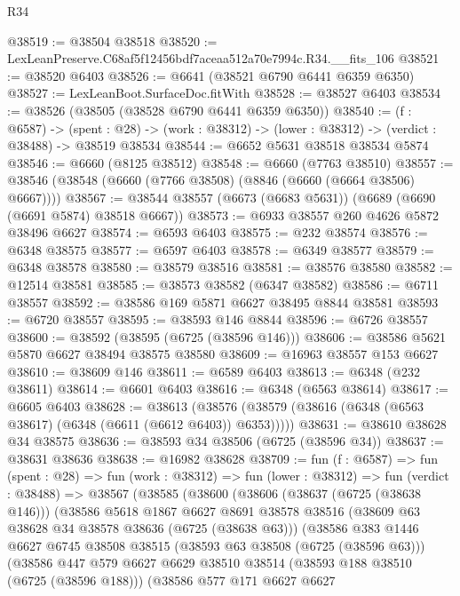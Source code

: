 \begin{lexlean}{R34}
\begin{coremodule}
@38519 := @38504 @38518
@38520 := LexLeanPreserve.C68af5f12456bdf7aceaa512a70e7994c.R34.__fits_106
@38521 := @38520 @6403
@38526 := @6641 (@38521 @6790 @6441 @6359 @6350)
@38527 := LexLeanBoot.SurfaceDoc.fitWith
@38528 := @38527 @6403
@38534 := @38526 (@38505 (@38528 @6790 @6441 @6359 @6350))
@38540 := (f : @6587) ->
  (spent : @28) -> (work : @38312) -> (lower : @38312) -> (verdict : @38488) -> @38519 @38534
@38544 := @6652 @5631 @38518 @38534 @5874
@38546 := @6660 (@8125 @38512)
@38548 := @6660 (@7763 @38510)
@38557 := @38546 (@38548 (@6660 (@7766 @38508) (@8846 (@6660 (@6664 @38506) @6667))))
@38567 := @38544 @38557 (@6673 (@6683 @5631)) (@6689 (@6690 (@6691 @5874) @38518 @6667))
@38573 := @6933 @38557 @260 @4626 @5872 @38496 @6627
@38574 := @6593 @6403
@38575 := @232 @38574
@38576 := @6348 @38575
@38577 := @6597 @6403
@38578 := @6349 @38577
@38579 := @6348 @38578
@38580 := @38579 @38516
@38581 := @38576 @38580
@38582 := @12514 @38581
@38585 := @38573 @38582 (@6347 @38582)
@38586 := @6711 @38557
@38592 := @38586 @169 @5871 @6627 @38495 @8844 @38581
@38593 := @6720 @38557
@38595 := @38593 @146 @8844
@38596 := @6726 @38557
@38600 := @38592 (@38595 (@6725 (@38596 @146)))
@38606 := @38586 @5621 @5870 @6627 @38494 @38575 @38580
@38609 := @16963 @38557 @153 @6627
@38610 := @38609 @146
@38611 := @6589 @6403
@38613 := @6348 (@232 @38611)
@38614 := @6601 @6403
@38616 := @6348 (@6563 @38614)
@38617 := @6605 @6403
@38628 := @38613
    (@38576 (@38579 (@38616 (@6348 (@6563 @38617) (@6348 (@6611 (@6612 @6403)) @6353)))))
@38631 := @38610 @38628 @34 @38575
@38636 := @38593 @34 @38506 (@6725 (@38596 @34))
@38637 := @38631 @38636
@38638 := @16982 @38628
@38709 := fun (f : @6587) =>
  fun (spent : @28) =>
  fun (work : @38312) =>
  fun (lower : @38312) =>
  fun (verdict : @38488) =>
  @38567
    (@38585
      (@38600
        (@38606
          (@38637 (@6725 (@38638 @146)))
          (@38586
            @5618
            @1867
            @6627
            @8691
            @38578
            @38516
            (@38609 @63 @38628 @34 @38578 @38636 (@6725 (@38638 @63)))
            (@38586
              @383
              @1446
              @6627
              @6745
              @38508
              @38515
              (@38593 @63 @38508 (@6725 (@38596 @63)))
              (@38586
                @447
                @579
                @6627
                @6629
                @38510
                @38514
                (@38593 @188 @38510 (@6725 (@38596 @188)))
                (@38586
                  @577
                  @171
                  @6627
                  @6627

\end{coremodule}
\end{lexlean}
